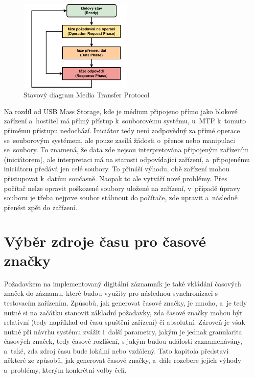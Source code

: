 \begin{figure}[h]
    \centering
    \includegraphics[width=0.50\textwidth]{obrazky-figures/mtp_phases.pdf}
    
    \caption{Stavový diagram Media Transfer Protocol~\cite{usb_standard_mtp}}
    \label{fig:mtp-protocol}
\end{figure}

Na rozdíl od USB Mass Storage, kde je médium připojeno přímo jako blokové zařízení a~hostitel má přímý přístup k~souborovému systému, u~MTP k~tomuto přímému přístupu nedochází. Iniciátor tedy není zodpovědný za přímé operace se~souborovým systémem, ale pouze zasílá žádosti o~přenos nebo manipulaci se~soubory. To znamená, že data zde nejsou interpretována připojeným zařízením (iniciátorem), ale interpretaci má na starosti odpovídající zařízení, a~připojenému iniciátoru předává jen celé soubory. To přináší výhodu, obě zařízení mohou přistupovat k~datům současně. Naopak to ale vytváří nové problémy. Přes počítač nelze opravit poškozené soubory uložené na zařízení, v~případě úpravy souboru je třeba nejprve soubor stáhnout do počítače, zde upravit a~následně přenést zpět do zařízení.~\cite{usb_standard_mtp}

\section{Výběr zdroje času pro časové značky}
\label{zdroje_casu}
Požadavkem na implementovaný digitální záznamník je také vkládání časových značek do záznamu, které budou využity pro následnou synchronizaci s testovacím zařízením. Způsobů, jak generovat časové značky, je mnoho, a~je tedy nutné si na začátku stanovit základní požadavky, zda časové značky mohou být relativní (tedy například od času spuštění zařízení) či absolutní. Zároveň je však nutné při návrhu systému zvážit i~další parametry, jakým je jednak granularita časových značek, tedy časové rozlišení, s jakým budou události zaznamenávány, a~také, zda zdroj času bude lokální nebo vzdálený. Tato kapitola představí některé ze způsobů, jak generovat časové značky, a~dále rozebere jejich výhody a~problémy, kterým konkrétní volby čelí.~\cite{perny2008zarizeni_cas_znacky}

